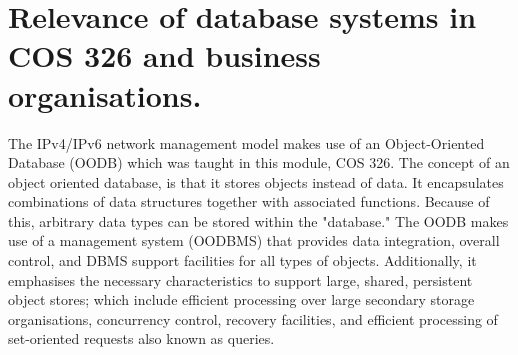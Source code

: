 
%
\section{Relevance of database systems in COS 326 and business organisations.}
\par {The IPv4/IPv6 network management model makes use of an Object-Oriented Database (OODB) which was taught in this module, COS 326. The concept of an object oriented database, is that it stores objects instead of data. It encapsulates combinations of data structures together with associated functions. Because of this, arbitrary data types can be stored within the "database." The OODB makes use of a management system (OODBMS) that provides data integration, overall control, and DBMS support facilities for all types of objects. Additionally, it emphasises the necessary characteristics to support large, shared, persistent object stores; which include efficient processing over large secondary storage organisations, concurrency control, recovery facilities, and efficient processing of set-oriented requests also known as queries.} \cite{a}
%